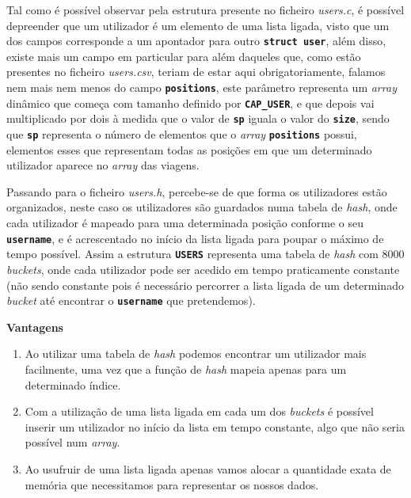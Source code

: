 \documentclass[12pt,a4paper]{report}
\begin{document}
Tal como é possível observar pela estrutura presente no ficheiro \textit{users.c}, é possível depreender que um utilizador é um elemento de uma lista ligada, visto que um dos campos corresponde a um apontador para outro \texttt{\small\textbf{struct user}}, além disso, existe mais um campo em particular para além daqueles que, como estão presentes no ficheiro \textit{users.csv}, teriam de estar aqui obrigatoriamente, falamos nem mais nem menos do campo \texttt{\small\textbf{positions}}, este parâmetro representa um \textit{array} dinâmico que começa com tamanho definido por \textbf{\small\texttt{CAP\_USER}}, e que depois vai multiplicado por dois à medida que o valor de \texttt{\small\textbf{sp}} iguala o valor do \small\texttt{\textbf{size}}, sendo que \texttt{\small\textbf{sp}} representa o número de elementos que o \textit{array} \texttt{\small\textbf{positions}} possui, elementos esses que representam todas as posições em que um determinado utilizador aparece no \textit{array} das viagens.

Passando para o ficheiro \textit{users.h}, percebe-se de que forma os utilizadores estão organizados, neste caso os utilizadores são guardados numa tabela de \textit{hash}, onde cada utilizador é mapeado para uma determinada posição conforme o seu \texttt{\small\textbf{username}}, e é acrescentado no início da lista ligada para poupar o máximo de tempo possível. Assim a estrutura \texttt{\small\textbf{USERS}} representa uma tabela de \textit{hash} com 8000 \textit{buckets}, onde cada utilizador pode ser acedido em tempo praticamente constante (não sendo constante pois é necessário percorrer a lista ligada de um determinado \textit{bucket} até encontrar o \texttt{\small\textbf{username}} que pretendemos).



\normalsize\textbf{Vantagens}
    \begin{enumerate}
        \item Ao utilizar uma tabela de \textit{hash} podemos encontrar um utilizador mais facilmente, uma vez que a função de \textit{hash} mapeia apenas para um determinado índice.

        \item Com a utilização de uma lista ligada em cada um dos \textit{buckets} é possível inserir um utilizador no início da lista em tempo constante, algo que não seria possível num \textit{array}.
        
        \item Ao usufruir de uma lista ligada apenas vamos alocar a quantidade exata de memória que necessitamos para representar os nossos dados. 
    \end{enumerate}
\end{document}
